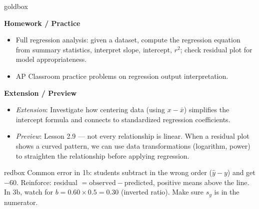 \documentclass[10pt]{article}
\begin{document}
\begin{skillbox}{goldbox}
\begin{minipage}[t]{0.48\linewidth}
    \textbf{Homework / Practice}
    \begin{itemize}
        \item Full regression analysis: given a dataset, compute the regression equation from summary statistics, interpret slope, intercept, $r^2$; check residual plot for model appropriateness.
        \item AP Classroom practice problems on regression output interpretation.
    \end{itemize}
\end{minipage}
\hfill
\begin{minipage}[t]{0.48\linewidth}
    \textbf{Extension / Preview}
    \begin{itemize}
        \item \textit{Extension}: Investigate how centering data (using $x - \bar{x}$) simplifies the intercept formula and connects to standardized regression coefficients.
        \item \textit{Preview}: Lesson 2.9 --- not every relationship is linear. When a residual plot shows a curved pattern, we can use data transformations (logarithm, power) to straighten the relationship before applying regression.
    \end{itemize}
\end{minipage}
\end{skillbox}


\begin{skillbox}{redbox}
Common error in 1b: students subtract in the wrong order ($\hat{y} - y$) and get $-60$.
Reinforce: residual $= \text{observed} - \text{predicted}$, positive means above the line.
In 3b, watch for $b = 0.60 \times 0.5 = 0.30$ (inverted ratio). Make sure $s_y$ is in the numerator.
\end{skillbox}
\end{document}
